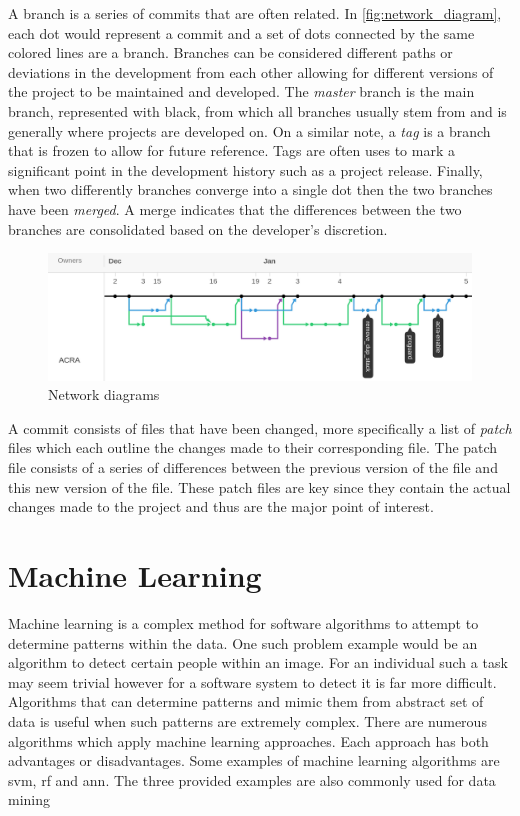 A branch is a series of commits that are often related. In \autoref{fig:network_diagram}, each dot would represent a commit and a set of dots connected by the same colored lines are a branch. Branches can be considered different paths or deviations in the development from each other allowing for different versions of the project to be maintained and developed. The \textit{master} branch is the main branch, represented with black, from which all branches usually stem from and is generally where projects are developed on. On a similar note, a \textit{tag} is a branch that is frozen to allow for future reference. Tags are often uses to mark a significant point in the development history such as a project release. Finally, when two differently branches converge into a single dot then the two branches have been \textit{merged}. A merge indicates that the differences between the two branches are consolidated based on the developer's discretion.

\begin{figure}[!ht]
    \centering
        \includegraphics[width=1.0\textwidth]{images/network}
    \caption{Network diagrams}
    \label{fig:network_diagram}
\end{figure}

A commit consists of files that have been changed, more specifically a list of \textit{patch} files which each outline the changes made to their corresponding file. The patch file consists of a series of differences between the previous version of the file and this new version of the file. These patch files are key since they contain the actual changes made to the project and thus are the major point of interest.


\section{Machine Learning}

Machine learning is a complex method for software algorithms to attempt to determine patterns within the data. One such problem example would be an algorithm to detect certain people within an image. For an individual such a task may seem trivial however for a software system to detect it is far more difficult. Algorithms that can determine patterns and mimic them from abstract set of data is useful when such patterns are extremely complex. There are numerous algorithms which apply machine learning approaches. Each approach has both advantages or disadvantages. Some examples of machine learning algorithms are \gls{svm}, \gls{rf} and \gls{ann}. The three provided examples are also commonly used for data mining \cite{Alam2013, Westland2011, Granitto2007, Huang2007, Jalbert2012, Yu2011} %

